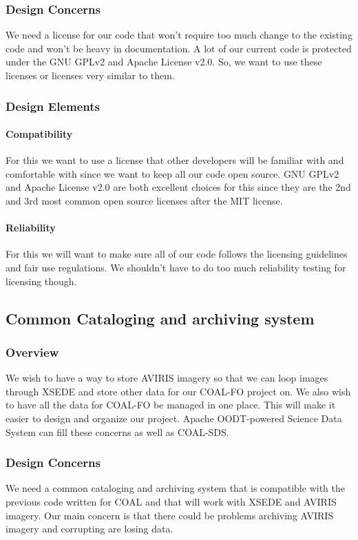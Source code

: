 \documentclass[10pt,draftclsnofoot,onecolumn,journal,compsoc]{IEEEtran}
\begin{document}
\subsubsection{Design Concerns}
We need a license for our code that won’t require too much change to the existing code and won’t be heavy in documentation. A lot of our current code is protected under the GNU GPLv2 and Apache License v2.0. So, we want to use these licenses or licenses very similar to them.
\subsubsection{Design Elements}
\paragraph{Compatibility}
For this we want to use a license that other developers will be familiar with and comfortable with since we want to keep all our code open source. GNU GPLv2 and Apache License v2.0 are both excellent choices for this since they are the 2nd and 3rd most common open source licenses after the MIT license.
\paragraph{Reliability}
For this we will want to make sure all of our code follows the licensing guidelines and fair use regulations. We shouldn't have to do too much reliability testing for licensing though.

\subsection{Common Cataloging and archiving system}
\subsubsection{Overview}
\noindent We wish to have a way to store AVIRIS imagery so that we can loop images through XSEDE and store other data for our COAL-FO project on. We also wish to have all the data for COAL-FO be managed in one place. This will make it easier to design and organize our project. Apache OODT-powered Science Data System can fill these concerns as well as COAL-SDS.
\subsubsection{Design Concerns}
We need a common cataloging and archiving system that is compatible with the previous code written for COAL and that will work with XSEDE and AVIRIS imagery. Our main concern is that there could be problems archiving AVIRIS imagery and corrupting are losing data.
\end{document}
